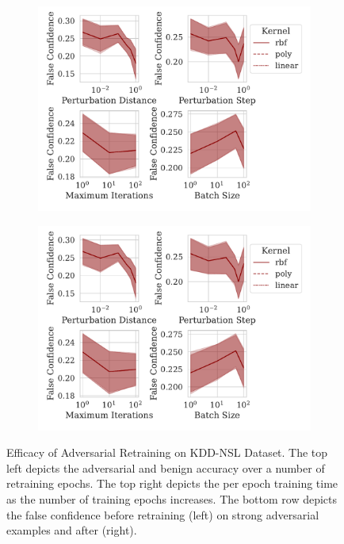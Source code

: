 \begin{figure}[h!]
     \hfill
     \begin{subfigure}{0.47\textwidth}
         \centering
         \includegraphics[width=\textwidth]{./kdd-nsl/confidence_vs_attack_parameters.pdf}
     \end{subfigure}
     \hfill
     \begin{subfigure}{0.47\textwidth}
         \centering
         \includegraphics[width=\textwidth]{./kdd-nsl/retrain_confidence_vs_attack_parameters.pdf}
     \end{subfigure}
     \hfill
     \caption{Efficacy of Adversarial Retraining on KDD-NSL Dataset. The top left depicts the adversarial and benign accuracy over a number of retraining epochs. The top right depicts the per epoch training time as the number of training epochs increases. The bottom row depicts the false confidence before retraining (left) on strong adversarial examples and after (right).}
     \label{fig:kdd-nsl}
\end{figure}
